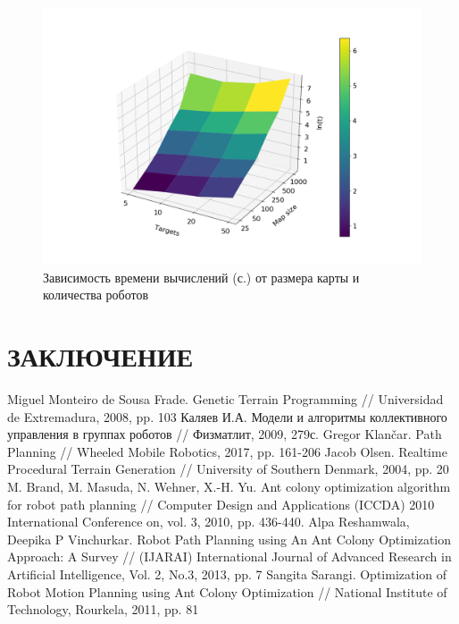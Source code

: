 \documentclass{article}
\numberwithin{equation}{section}
\begin{document}
			\begin{figure}[H]
				\centering
				\vspace{-0.5cm}
				\includegraphics[width=\textwidth]{data/mean_surface.png}
				\vspace{-0.5cm}
				\caption{Зависимость времени вычислений (с.) от размера карты и количества роботов}\label{fig:time_surface}
			\end{figure}

    \newpage
    \section*{ЗАКЛЮЧЕНИЕ}

    \newpage
	\renewcommand\refname{ЛИТЕРАТУРА}
	\begin{thebibliography}{}
		 Miguel Monteiro de Sousa Frade. Genetic Terrain Programming // Universidad de Extremadura, 2008, pp. 103
		 Каляев И.А. Модели и алгоритмы коллективного управления в группах роботов // Физматлит, 2009, 279с.
		 Gregor Klančar. Path Planning // Wheeled Mobile Robotics, 2017, pp. 161-206
		 Jacob Olsen. Realtime Procedural Terrain Generation // University of Southern Denmark, 2004, pp. 20
		 M. Brand, M. Masuda, N. Wehner, X.-H. Yu. Ant colony optimization algorithm for robot path planning // Computer Design and Applications (ICCDA) 2010 International Conference on, vol. 3, 2010, pp. 436-440.
		 Alpa Reshamwala, Deepika P Vinchurkar. Robot Path Planning using An Ant Colony Optimization Approach: A Survey // (IJARAI) International Journal of Advanced Research in Artificial Intelligence, Vol. 2, No.3, 2013, pp. 7
		 Sangita Sarangi. Optimization of Robot Motion Planning using Ant Colony Optimization // National Institute of Technology, Rourkela, 2011, pp. 81
	\end{thebibliography}
\end{document}
